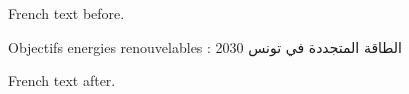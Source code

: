 \documentclass{article}
\begin{document}
French text before.

{\arabicfont Objectifs energies renouvelables : الطاقة المتجددة في تونس 2030}

French text after.
\end{document}
